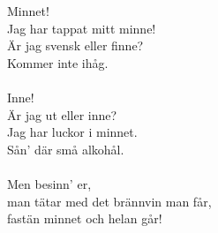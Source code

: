 
            Minnet! \\
            Jag har tappat mitt minne! \\
            Är jag svensk eller finne? \\
            Kommer inte ihåg. \\
\hspace{10mm} \\
            Inne! \\
            Är jag ut eller inne? \\
            Jag har luckor i minnet. \\
            Sån' där små alkohål. \\
\hspace{10mm} \\
            Men besinn' er, \\
            man tätar med det brännvin man får, \\
            fastän minnet och helan går! \\
